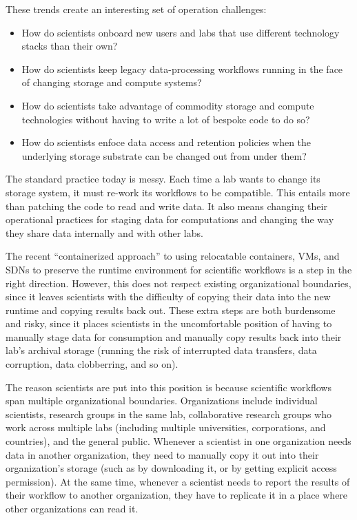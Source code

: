 These trends create an interesting set of operation challenges:

\begin{itemize}
   \item How do scientists onboard new users and labs that use different
      technology stacks than their own?
   \item How do scientists keep legacy data-processing workflows running in the face
      of changing storage and compute systems?
   \item How do scientists take advantage of commodity storage and
      compute technologies without having to write a lot of bespoke code
      to do so?
   \item How do scientists enfoce data access and retention policies when the
      underlying storage substrate can be changed out from under them?
\end{itemize}

The standard practice today is messy.  Each time a lab wants to change its
storage system, it must re-work its workflows to be compatible.  This entails
more than patching the code to read and write data.  It also means changing their
operational practices for staging data for computations and changing the way they
share data internally and with other labs.

The recent ``containerized approach'' to using relocatable containers, VMs, and
SDNs to preserve the runtime environment for scientific workflows
is a step in the right direction.  However, this does not respect existing
organizational boundaries, since it leaves scientists with the difficulty of
copying their data into the new runtime and copying results back out.  These
extra steps are both burdensome and risky, since it places scientists in
the uncomfortable position of having to manually stage data for consumption and
manually copy results back into their lab's archival storage (running the risk
of interrupted data transfers, data corruption, data clobberring, and so on).

The reason scientists are put into this position is because scientific workflows
span multiple organizational boundaries.  Organizations include individual
scientists, research groups in the same lab, collaborative research groups who
work across multiple labs (including multiple universities, corporations, and
countries), and the general public.  Whenever a scientist in one organization
needs data in another organization, they need to manually copy it out into their
organization's storage (such as by downloading it, or by getting explicit access
permission).  At the same time, whenever a scientist needs to report the results
of their workflow to another organization, they have to replicate it in a place
where other organizations can read it.

